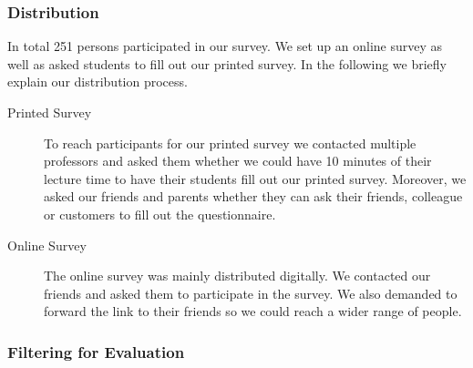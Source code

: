\subsubsection{Distribution}
In total 251 persons participated in our survey.
 We set up an online survey as well as asked students to fill out our printed survey.
 In the following we briefly explain our distribution process.


\begin{description}
	\item[Printed Survey] To reach participants for our printed survey we contacted multiple professors and asked them whether we could have 10 minutes of their lecture time to have their students fill out our printed survey.
 Moreover, we asked our friends and parents whether they can ask their friends, colleague or customers to fill out the questionnaire.

	\item[Online Survey] The online survey was mainly distributed digitally.
 We contacted our friends and asked them to participate in the survey.
 We also demanded to forward the link to their friends so we could reach a wider range of people.

\end{description}

\subsubsection{Filtering for Evaluation}

